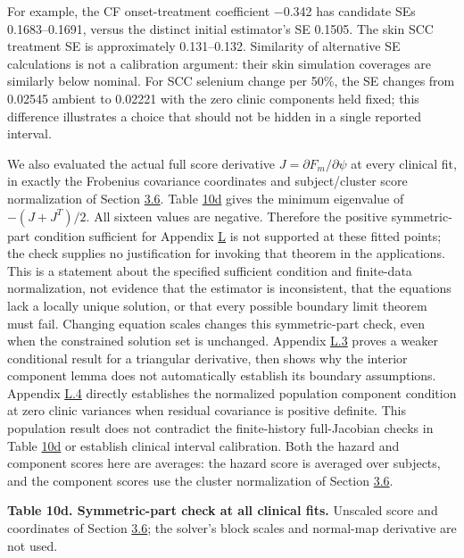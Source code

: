 \documentclass[11pt]{article}
\begin{document}
For example, the CF onset-treatment coefficient $-$0.342 has candidate SEs 0.1683--0.1691, versus the distinct initial estimator's SE 0.1505. The skin SCC treatment SE is approximately 0.131--0.132. Similarity of alternative SE calculations is not a calibration argument: their skin simulation coverages are similarly below nominal. For SCC selenium change per 50\%, the SE changes from 0.02545 ambient to 0.02221 with the zero clinic components held fixed; this difference illustrates a choice that should not be hidden in a single reported interval.

We also evaluated the actual full score derivative \(J=\partial F_m/\partial\psi\) at every clinical fit, in exactly the Frobenius covariance coordinates and subject/cluster score normalization of Section \hyperref[sec:3.6]{3.6}. Table \hyperref[tab:10d]{10d} gives the minimum eigenvalue of \(-(J+J^T)/2\). All sixteen values are negative. Therefore the positive symmetric-part condition sufficient for Appendix \hyperref[sec:L]{L} is not supported at these fitted points; the check supplies no justification for invoking that theorem in the applications. This is a statement about the specified sufficient condition and finite-data normalization, not evidence that the estimator is inconsistent, that the equations lack a locally unique solution, or that every possible boundary limit theorem must fail. Changing equation scales changes this symmetric-part check, even when the constrained solution set is unchanged. Appendix \hyperref[sec:L.3]{L.3} proves a weaker conditional result for a triangular derivative, then shows why the interior component lemma does not automatically establish its boundary assumptions. Appendix \hyperref[sec:L.4]{L.4} directly establishes the normalized population component condition at zero clinic variances when residual covariance is positive definite. This population result does not contradict the finite-history full-Jacobian checks in Table \hyperref[tab:10d]{10d} or establish clinical interval calibration. Both the hazard and component scores here are averages: the hazard score is averaged over subjects, and the component scores use the cluster normalization of Section \hyperref[sec:3.6]{3.6}.

\label{tab:10d}
\textbf{Table 10d. Symmetric-part check at all clinical fits.} Unscaled score and coordinates of Section \hyperref[sec:3.6]{3.6}; the solver's block scales and normal-map derivative are not used.
\end{document}
